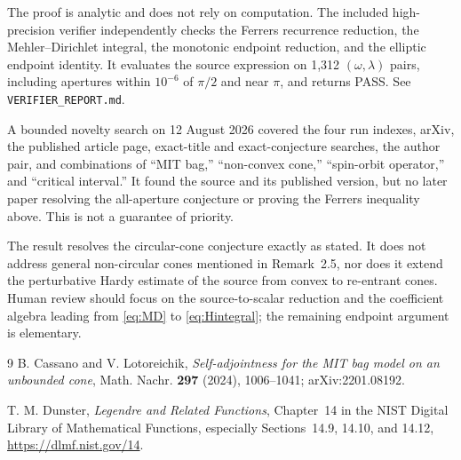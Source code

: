 \documentclass[11pt]{article}
\begin{document}
The proof is analytic and does not rely on computation.  The included
high-precision verifier independently checks the Ferrers recurrence reduction,
the Mehler--Dirichlet integral, the monotonic endpoint reduction, and the
elliptic endpoint identity.  It evaluates the source expression on 1,312
$(\omega,\lambda)$ pairs, including apertures within $10^{-6}$ of $\pi/2$ and
near $\pi$, and returns PASS.  See \texttt{VERIFIER\_REPORT.md}.

A bounded novelty search on 12 August 2026 covered the four run indexes,
arXiv, the published article page, exact-title and exact-conjecture searches,
the author pair, and combinations of ``MIT bag,'' ``non-convex cone,''
``spin-orbit operator,'' and ``critical interval.''  It found the source and
its published version, but no later paper resolving the all-aperture
conjecture or proving the Ferrers inequality above.  This is not a guarantee
of priority.

The result resolves the circular-cone conjecture exactly as stated.  It does
not address general non-circular cones mentioned in Remark~2.5, nor does it
extend the perturbative Hardy estimate of the source from convex to
re-entrant cones.  Human review should focus on the source-to-scalar reduction
and the coefficient algebra leading from \eqref{eq:MD} to
\eqref{eq:Hintegral}; the remaining endpoint argument is elementary.

\begin{thebibliography}{9}
B. Cassano and V. Lotoreichik,
\emph{Self-adjointness for the MIT bag model on an unbounded cone},
Math. Nachr. \textbf{297} (2024), 1006--1041; arXiv:2201.08192.

T. M. Dunster, \emph{Legendre and Related Functions}, Chapter~14 in the
NIST Digital Library of Mathematical Functions, especially
Sections~14.9, 14.10, and 14.12,
\url{https://dlmf.nist.gov/14}.
\end{thebibliography}
\end{document}
